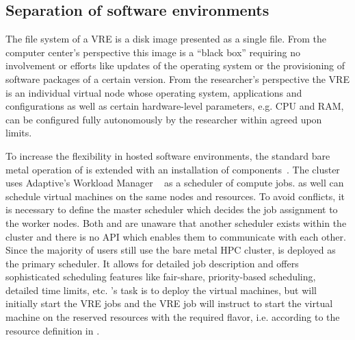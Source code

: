 \subsection{Separation of software environments}

The file system of a VRE is a
disk image presented as a single file. From the computer center's perspective
this image is a ``black box'' requiring no involvement or efforts like
updates of the operating system or the provisioning of software packages of a
certain version. From the researcher's perspective the VRE is an individual
virtual node whose operating system, applications and configurations
as well as certain hardware-level parameters, e.g. CPU and RAM, can be
configured fully autonomously by the researcher within agreed upon limits.


To increase the flexibility in hosted software environments, the standard bare metal
operation of \NEMO is extended with an installation of \Openstack
components~\cite{hpc-symp:2016}.
The \NEMO cluster uses Adaptive's Workload Manager \Moab~\cite{Moab} as a
scheduler of compute jobs.
\Openstack as well can schedule virtual machines on the same nodes and
resources.
To avoid conflicts, it is necessary to define the master scheduler
which decides the job assignment to the worker nodes.
Both \Moab and \Openstack are
unaware that another scheduler exists within the cluster and there is
no API which enables them to  communicate with each other. Since the majority of users still use the
bare metal HPC cluster, \Moab is deployed as the primary scheduler. It allows for
detailed job description and offers sophisticated scheduling features like
fair-share, priority-based scheduling, detailed time limits,
etc. \Openstack 's task is to deploy the virtual machines, but \Moab will initially start the VRE
jobs and the VRE job will instruct \Openstack to start the virtual machine on the
reserved resources with the required flavor, i.e. according to the resource definition in \Openstack.


